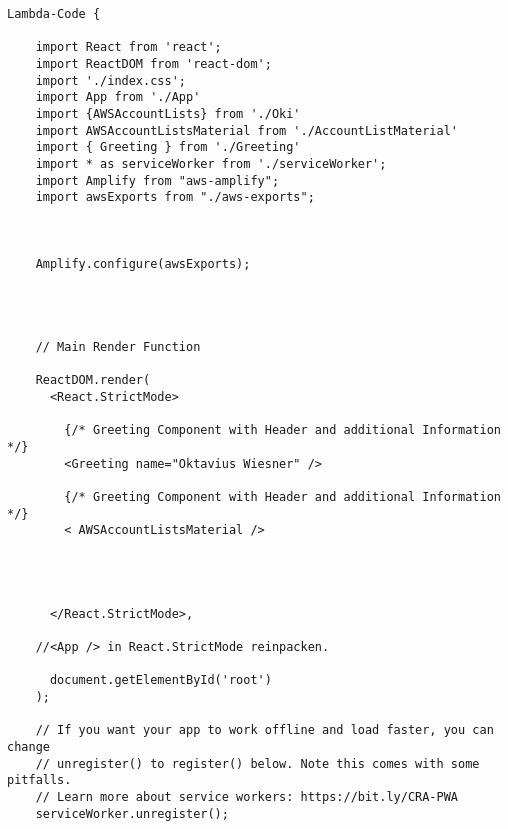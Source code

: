 

\begin{lstlisting}[caption={React index.js Main Render Funktion},
label=lst:Beispielcode 1,basicstyle=\ttfamily\small ] Lambda-Code {

    import React from 'react';
    import ReactDOM from 'react-dom';
    import './index.css';
    import App from './App'
    import {AWSAccountLists} from './Oki'
    import AWSAccountListsMaterial from './AccountListMaterial'
    import { Greeting } from './Greeting'
    import * as serviceWorker from './serviceWorker';
    import Amplify from "aws-amplify";
    import awsExports from "./aws-exports";



    Amplify.configure(awsExports);




    // Main Render Function

    ReactDOM.render(
      <React.StrictMode>

        {/* Greeting Component with Header and additional Information */}
        <Greeting name="Oktavius Wiesner" />

        {/* Greeting Component with Header and additional Information */}
        < AWSAccountListsMaterial />




      </React.StrictMode>,

    //<App /> in React.StrictMode reinpacken.

      document.getElementById('root')
    );

    // If you want your app to work offline and load faster, you can change
    // unregister() to register() below. Note this comes with some pitfalls.
    // Learn more about service workers: https://bit.ly/CRA-PWA
    serviceWorker.unregister();

\end{lstlisting}
